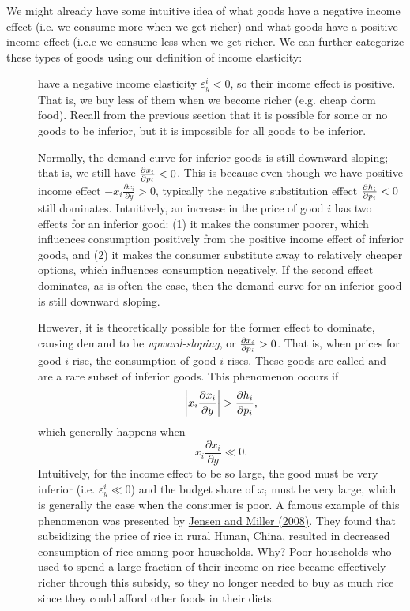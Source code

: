 We might already have some intuitive idea of what goods have a negative income effect (i.e. we consume more when we get richer) and what goods have a positive income effect (i.e.e we consume less when we get richer. We can further categorize these types of goods using our definition of income elasticity:
\begin{description}
\item[] have a negative income elasticity $\varepsilon_y^i < 0$, so their income effect is positive. That is, we buy less of them when we become richer (e.g. cheap dorm food). Recall from the previous section that it is possible for some or no goods to be inferior, but it is impossible for all goods to be inferior. 

Normally, the demand-curve for inferior goods is still downward-sloping; that is, we still have $\pdv{x_i}{p_i} < 0$. This is because even though we have positive income effect $-x_{i} \frac{\partial x_{i}}{\partial y}>0$, typically the negative substitution effect $\pdv{h_i}{p_i} < 0$ still dominates. Intuitively, an increase in the price of good $i$ has two effects for an inferior good: (1) it makes the consumer poorer, which influences consumption positively from the positive income effect of inferior goods, and (2) it makes the consumer substitute away to relatively cheaper options, which influences consumption negatively. If the second effect dominates, as is often the case, then the demand curve for an inferior good is still downward sloping.

However, it is theoretically possible for the former effect to dominate, causing demand to be \textit{upward-sloping}, or $\pdv{x_i}{p_i} > 0$. That is, when prices for good $i$ rise, the consumption of good $i$ rises. These goods are called  and are a rare subset of inferior goods. This phenomenon occurs if 
$$
\bigg | x_{i} \frac{\partial x_{i}}{\partial y} \bigg | > \pdv{h_i}{p_i},
$$
which generally happens when 
$$x_{i} \frac{\partial x_{i}}{\partial y} \ll 0.$$
Intuitively, for the income effect to be so large, the good must be very inferior (i.e. $\varepsilon_y^i \ll 0$) and the budget share of $x_i$ must be very large, which is generally the case when the consumer is poor. A famous example of this phenomenon was presented by \href{https://www.ncbi.nlm.nih.gov/pmc/articles/PMC2964162/}{Jensen and Miller (2008)}. They found that subsidizing the price of rice in rural Hunan, China, resulted in decreased consumption of rice among poor households. Why? Poor households who used to spend a large fraction of their income on rice became effectively richer through this subsidy, so they no longer needed to buy as much rice since they could afford other foods in their diets.


\end{description}
